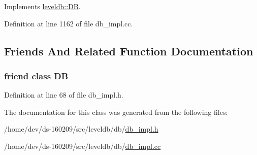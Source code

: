 Implements \hyperlink{classleveldb_1_1_d_b_ae0b6ded8c8e0b88ff70190bf7a0c086c}{leveldb\+::\+D\+B}.



Definition at line 1162 of file db\+\_\+impl.\+cc.



\subsection{Friends And Related Function Documentation}
\hypertarget{classleveldb_1_1_d_b_impl_ad22eb7a23cbf34de526efa966c578d4a}{}
\subsubsection[{D\+B}]{\setlength{\rightskip}{0pt plus 5cm}friend class {\bf D\+B}\hspace{0.3cm}{\ttfamily [friend]}}\label{classleveldb_1_1_d_b_impl_ad22eb7a23cbf34de526efa966c578d4a}


Definition at line 68 of file db\+\_\+impl.\+h.



The documentation for this class was generated from the following files\+:\begin{DoxyCompactItemize}
\item 
/home/dev/ds-\/160209/src/leveldb/db/\hyperlink{db__impl_8h}{db\+\_\+impl.\+h}\item 
/home/dev/ds-\/160209/src/leveldb/db/\hyperlink{db__impl_8cc}{db\+\_\+impl.\+cc}\end{DoxyCompactItemize}
